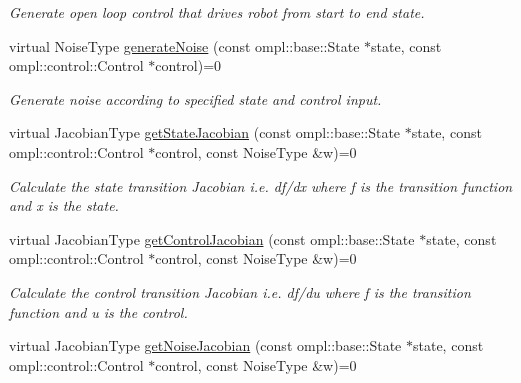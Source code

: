 \begin{DoxyCompactItemize}
\begin{DoxyCompactList}\small\item\em \-Generate open loop control that drives robot from start to end state. \end{DoxyCompactList}\item 
\hypertarget{class_motion_model_method_a036e2254bcae3730fe157419f9cf9c19}{virtual \-Noise\-Type \hyperlink{class_motion_model_method_a036e2254bcae3730fe157419f9cf9c19}{generate\-Noise} (const ompl\-::base\-::\-State $\ast$state, const ompl\-::control\-::\-Control $\ast$control)=0}\label{class_motion_model_method_a036e2254bcae3730fe157419f9cf9c19}

\begin{DoxyCompactList}\small\item\em \-Generate noise according to specified state and control input. \end{DoxyCompactList}\item 
\hypertarget{class_motion_model_method_af1429b7c54c0b6bdde9e6b8272bbb50e}{virtual \-Jacobian\-Type \hyperlink{class_motion_model_method_af1429b7c54c0b6bdde9e6b8272bbb50e}{get\-State\-Jacobian} (const ompl\-::base\-::\-State $\ast$state, const ompl\-::control\-::\-Control $\ast$control, const \-Noise\-Type \&w)=0}\label{class_motion_model_method_af1429b7c54c0b6bdde9e6b8272bbb50e}

\begin{DoxyCompactList}\small\item\em \-Calculate the state transition \-Jacobian i.\-e. df/dx where f is the transition function and x is the state. \end{DoxyCompactList}\item 
\hypertarget{class_motion_model_method_aac2be89931926f5883fd4e0ec0b7a073}{virtual \-Jacobian\-Type \hyperlink{class_motion_model_method_aac2be89931926f5883fd4e0ec0b7a073}{get\-Control\-Jacobian} (const ompl\-::base\-::\-State $\ast$state, const ompl\-::control\-::\-Control $\ast$control, const \-Noise\-Type \&w)=0}\label{class_motion_model_method_aac2be89931926f5883fd4e0ec0b7a073}

\begin{DoxyCompactList}\small\item\em \-Calculate the control transition \-Jacobian i.\-e. df/du where f is the transition function and u is the control. \end{DoxyCompactList}\item 
\hypertarget{class_motion_model_method_adefbf482a8d6d409b262cb1af014026a}{virtual \-Jacobian\-Type \hyperlink{class_motion_model_method_adefbf482a8d6d409b262cb1af014026a}{get\-Noise\-Jacobian} (const ompl\-::base\-::\-State $\ast$state, const ompl\-::control\-::\-Control $\ast$control, const \-Noise\-Type \&w)=0}\label{class_motion_model_method_adefbf482a8d6d409b262cb1af014026a}


\end{DoxyCompactItemize}
